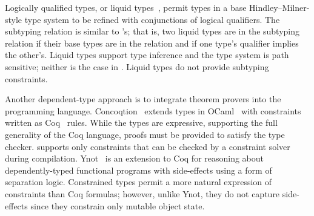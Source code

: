 





Logically qualified types, or liquid types~\cite{liquid-types},
permit types in a base Hindley--Milner-style type system to be refined with
conjunctions of logical qualifiers.  The subtyping relation is similar to
\Xten{}'s; that is, two liquid types are in the subtyping relation if their base
types are in the relation and if one type's qualifier implies the other's.
Liquid types support type inference and 
the type system is path sensitive; neither is the case in \Xten.
Liquid types do not provide subtyping constraints.


Another dependent-type approach is to integrate theorem 
provers into the programming language.
Concoqtion~\cite{concoqtion} extends types in OCaml~\cite{ocaml}
with constraints written as Coq~\cite{coq} rules.
While the types are expressive, supporting the full generality
of the Coq language, proofs must be
provided to satisfy the type checker.
\Xten{} supports only constraints that can be checked by a
constraint solver during compilation.
Ynot~\cite{ynot} is an extension to Coq for reasoning about 
dependently-typed functional programs with side-effects using a
form of separation logic.
Constrained types permit a more natural expression of constraints
than Coq formulas; however, unlike Ynot, they do not capture
side-effects since they constrain
only mutable object state.

